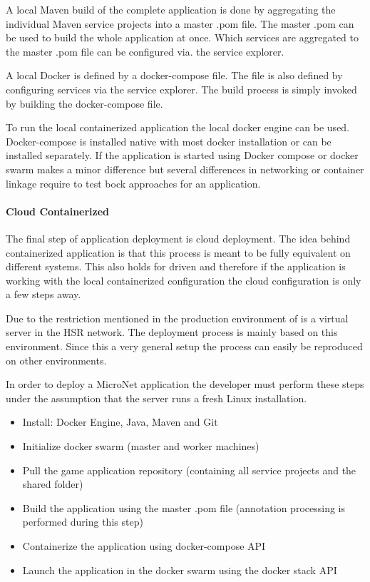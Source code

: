 A local Maven build of the complete application is done by aggregating the
individual Maven service projects into a master .pom file. The master .pom can
be used to build the whole application at once. Which services are aggregated to
the master .pom file can be configured via. the service explorer.

A local Docker is defined by a docker-compose file. The file is also defined by
configuring services via the service explorer. The build process is simply
invoked by building the docker-compose file.

To run the local containerized application the local docker engine can be used.
Docker-compose is installed native with most docker installation or can be
installed separately. If the application is started using Docker compose or
docker swarm makes a minor difference but several differences in networking or
container linkage require to test bock approaches for an application.

\paragraph{Cloud Containerized}

The final step of \ms{} application deployment is cloud deployment. The idea
behind containerized application is that this process is meant to be fully
equivalent on different systems. This also holds for \ms{} driven \og{} and
therefore if the application is working with the local containerized
configuration the cloud configuration is only a few steps away.

Due to the restriction mentioned in  the production environment
of \mn{} is a virtual server in the HSR network. The deployment process is
mainly based on this environment. Since this a very general setup the process
can easily be reproduced on other environments.

In order to deploy a MicroNet \ms{} application the developer must perform these
steps under the assumption that the server runs a fresh Linux installation.

\begin{itemize}
  \item Install: Docker Engine, Java, Maven and Git
  \item Initialize docker swarm (master and worker machines)
  \item Pull the game application repository (containing all service projects
  and the shared folder)
  \item Build the application using the master .pom file (annotation processing
  is performed during this step)
  \item Containerize the application using docker-compose API
  \item Launch the application in the docker swarm using the docker stack API 
\end{itemize}

